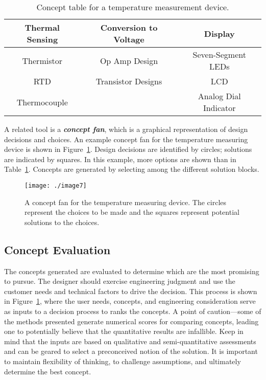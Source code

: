 \begin{table}
\caption{Concept table for a temperature measurement device.}
\label{table:conceptTemperature}
\begin{tabular}{|c|c|c|}
\hline
\rowcolor{Gray}
\textbf{Thermal Sensing} &
\textbf{Conversion to Voltage} &
\textbf{Display} \\ \hline
Thermistor & Op Amp Design & Seven-Segment LEDs \\ \hline
RTD & Transistor Designs & LCD \\ \hline
Thermocouple & & Analog Dial Indicator \\ \hline
\end{tabular}
\end{table}

A related tool is a \emph{\textbf{concept fan}}, which is a graphical
representation of design decisions and choices. An example concept fan
for the temperature measuring device is shown in 
Figure~\ref{figure:conceptFan}. Design
decisions are identified by circles; solutions are indicated by squares.
In this example, more options are shown than in 
Table~\ref{table:conceptTemperature}. Concepts are
generated by selecting among the different solution blocks.

\begin{figure}
\texttt{[image: ./image7]}
\caption{A concept fan for the temperature measuring device.
The circles represent the choices to be made and the squares represent
potential solutions to the choices.}
\label{figure:conceptFan}
\end{figure}


\subsection{Concept Evaluation}\label{concept-evaluation}

The concepts generated are evaluated to determine which are the most
promising to pursue. The designer should exercise engineering judgment
and use the customer needs and technical factors to drive the decision.
This process is shown in 
Figure~\ref{figure:conceptFan}, where the user needs, concepts, and
engineering consideration serve as inputs to a decision process to ranks
the concepts. A point of caution---some of the methods presented
generate numerical scores for comparing concepts, leading one to
potentially believe that the quantita­tive results are infallible. Keep
in mind that the inputs are based on qualitative and semi-quantitative
assessments and can be geared to select a preconceived notion of the
solution. It is important to maintain flexibility of thinking, to
challenge assumptions, and ultimately determine the best concept.

